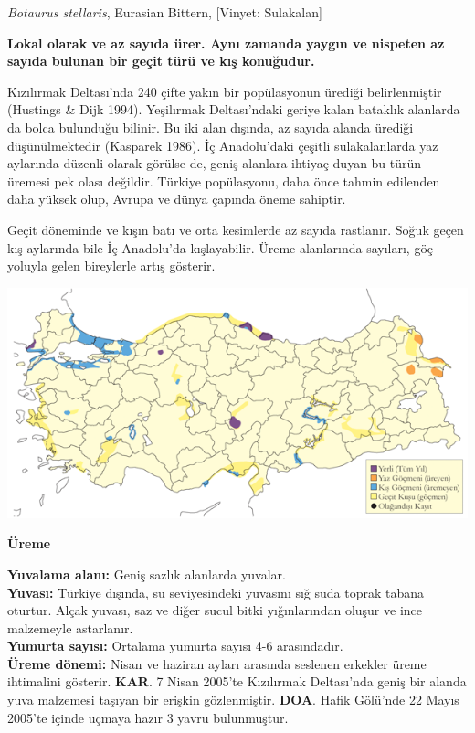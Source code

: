 \documentclass[
  letterpaper,
  DIV=11,
  numbers=noendperiod]{scrreprt}
\begin{document}
\emph{Botaurus stellaris}, Eurasian Bittern, {[}Vinyet: Sulakalan{]}

\textbf{Lokal olarak ve az sayıda ürer. Aynı zamanda yaygın ve nispeten
az sayıda bulunan bir geçit türü ve kış konuğudur.}

Kızılırmak Deltası'nda 240 çifte yakın bir popülasyonun ürediği
belirlenmiştir (Hustings \& Dijk 1994). Yeşilırmak Deltası'ndaki geriye
kalan bataklık alanlarda da bolca bulunduğu bilinir. Bu iki alan
dışında, az sayıda alanda ürediği düşünülmektedir (Kasparek 1986). İç
Anadolu'daki çeşitli sulakalanlarda yaz aylarında düzenli olarak görülse
de, geniş alanlara ihtiyaç duyan bu türün üremesi pek olası değildir.
Türkiye popülasyonu, daha önce tahmin edilenden daha yüksek olup, Avrupa
ve dünya çapında öneme sahiptir.

Geçit döneminde ve kışın batı ve orta kesimlerde az sayıda rastlanır.
Soğuk geçen kış aylarında bile İç Anadolu'da kışlayabilir. Üreme
alanlarında sayıları, göç yoluyla gelen bireylerle artış gösterir.

\includegraphics{images/harita_Page_064.png}

\textbf{Üreme}

\textbf{Yuvalama alanı:} Geniş sazlık alanlarda yuvalar.\\
\textbf{Yuvası:} Türkiye dışında, su seviyesindeki yuvasını sığ suda
toprak tabana oturtur. Alçak yuvası, saz ve diğer sucul bitki
yığınlarından oluşur ve ince malzemeyle astarlanır.\\
\textbf{Yumurta sayısı:} Ortalama yumurta sayısı 4-6 arasındadır.\\
\textbf{Üreme dönemi:} Nisan ve haziran ayları arasında seslenen
erkekler üreme ihtimalini gösterir. \textbf{KAR}. 7 Nisan 2005'te
Kızılırmak Deltası'nda geniş bir alanda yuva malzemesi taşıyan bir
erişkin gözlenmiştir. \textbf{DOA}. Hafik Gölü'nde 22 Mayıs 2005'te
içinde uçmaya hazır 3 yavru bulunmuştur.
\end{document}
